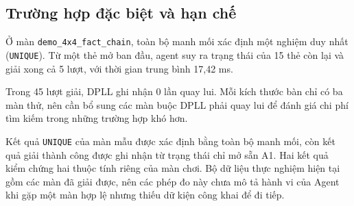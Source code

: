 \subsection{Trường hợp đặc biệt và hạn chế}
Ở màn \texttt{demo\_4x4\_fact\_chain}, toàn bộ manh mối xác định
một nghiệm duy nhất (\texttt{UNIQUE}). Từ một thẻ mở ban đầu, agent
suy ra trạng thái của 15 thẻ còn lại và giải xong cả 5 lượt, với
thời gian trung bình 17,42 ms.

Trong 45 lượt giải, DPLL ghi nhận 0 lần quay lui. Mỗi kích thước
bàn chỉ có ba màn thử, nên cần bổ sung các màn buộc DPLL phải quay
lui để đánh giá chi phí tìm kiếm trong những trường hợp khó hơn.

Kết quả \texttt{UNIQUE} của màn mẫu được xác định bằng toàn bộ manh mối,
còn kết quả giải thành công được ghi nhận từ trạng thái chỉ mở sẵn A1.
Hai kết quả kiểm chứng hai thuộc tính riêng của màn chơi. Bộ dữ liệu
thực nghiệm hiện tại gồm các màn đã giải được, nên các phép đo này
chưa mô tả hành vi của Agent khi gặp một màn hợp lệ nhưng thiếu dữ
kiện công khai để đi tiếp.
